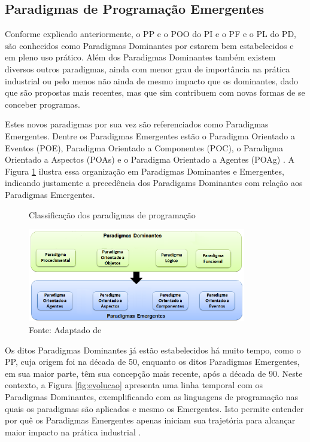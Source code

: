 \subsection{Paradigmas de Programação Emergentes}\label{sec:intro_emergentes}

Conforme explicado anteriormente, o PP e o POO do PI e o PF e o PL do PD, são
conhecidos como Paradigmas Dominantes por estarem bem estabelecidos e em pleno
uso prático. Além dos Paradigmas Dominantes também existem diversos outros
paradigmas, ainda com menor grau de importância na prática industrial ou pelo
menos não ainda de mesmo impacto que os dominantes, dado que são propostas mais
recentes, mas que sim contribuem com novas formas de se conceber programas.

Estes novos paradigmas por sua vez são referenciados como Paradigmas Emergentes.
Dentre os Paradigmas Emergentes estão o Paradigma Orientado a Eventos (POE),
Paradigma Orientado a Componentes (POC), o Paradigma Orientado a Aspectos (POAs)
e o Paradigma Orientado a Agentes (POAg) \cite{msc_Banaszewski_2009}. A Figura
\ref{fig:emergentes} ilustra essa organização em Paradigmas Dominantes e
Emergentes, indicando justamente a precedência dos Paradigams Dominantes com
relação aos Paradigmas Emergentes.

\begin{figure}[!htb]
  \centering
  \caption{Classificação dos paradigmas de programação}
  \includegraphics[width=0.85\textwidth]{../figures/classificacao_cut3.png}
  \caption*{Fonte: Adaptado de }
  \label{fig:emergentes}
\end{figure}

Os ditos Paradigmas Dominantes já estão estabelecidos há muito tempo, como o PP,
cuja origem foi na década de 50, enquanto os ditos Paradigmas Emergentes, em sua
maior parte, têm sua concepção mais recente, após a década de 90. Neste
contexto, a Figura \ref{fig:evolucao} apresenta uma linha temporal com os
Paradigmas Dominantes, exemplificando com as linguagens de programação nas quais
os paradigmas são aplicados e mesmo os Emergentes. Isto permite entender por quê
os Paradigmas Emergentes apenas iniciam sua trajetória para alcançar maior
impacto na prática industrial \cite{msc_Banaszewski_2009}.

